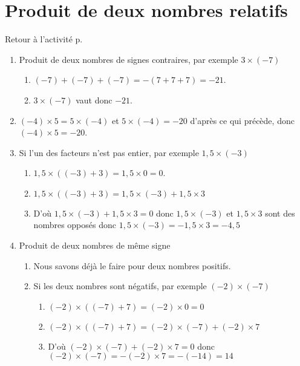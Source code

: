  \label{corrN1activite003}
\section*{Produit de deux nombres relatifs}
Retour à l'activité p. \hyperref[N1activite003]{\pageref{N1activite003}}

\begin{enumerate}
    \item Produit de deux nombres de signes contraires, par exemple $3\times(-7)$
    \begin{enumerate}
        \item $(-7)+(-7)+(-7) = -(7+7+7) = -21$.
        \item $3\times (-7)$ vaut donc $-21$.
    \end{enumerate}
    \item $(-4)\times 5= 5\times (-4)$ et $5\times (-4) = -20$ d'après ce qui précède, donc $(-4)\times 5 = -20$.
    \item Si l'un des facteurs n'est pas entier, par exemple $1,5\times (-3)$
    \begin{enumerate}
        \item $1,5\times ((-3)+3) = 1,5\times 0 = 0$.
        \item $1,5\times ((-3)+3) = 1,5\times (-3) + 1,5\times 3$ 
        \item D'où $1,5\times (-3) + 1,5\times 3 = 0 $ donc $1,5\times (-3)$ et $1,5\times 3$ sont des nombres opposés donc $1,5\times (-3) = - 1,5\times 3 = -4,5$
    \end{enumerate}
    \item Produit de deux nombres de même signe
    \begin{enumerate}
        \item Nous savons déjà le faire pour deux nombres positifs.
        \item Si les deux nombres sont négatifs, par exemple $(-2)\times (-7)$
        \begin{enumerate}
            \item $(-2)\times ((-7)+7) = (-2)\times 0 = 0$
            \item $(-2)\times ((-7)+7) = (-2)\times (-7) + (-2)\times 7$
            \item D'où $(-2)\times (-7) + (-2)\times 7=0$ donc $(-2)\times (-7) = - (-2)\times 7 = -(-14) = 14$
        \end{enumerate}
    \end{enumerate}
\end{enumerate}

